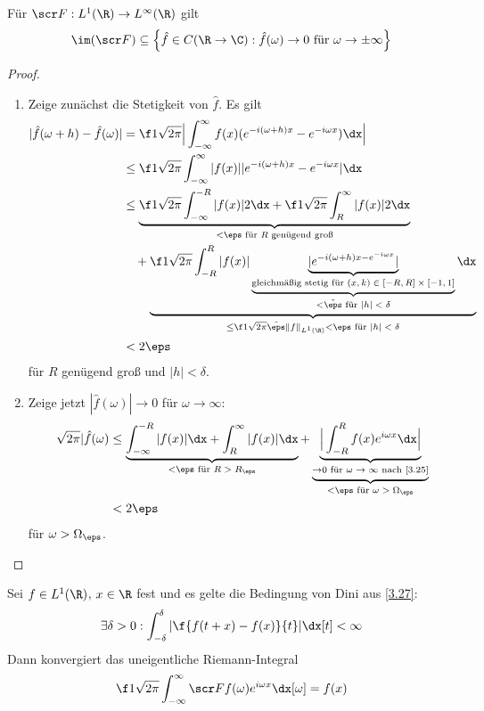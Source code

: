 \begin{st} \label{4.25}
	Für $\scr F: L^1(\R) \to L^\infty(\R)$ gilt
	\[
		\im (\scr F) \subset \Big\{ \hat f \in C(\R \to \C) : \hat f(\omega) \to 0 \text{ für } \omega \to \pm \infty \Big\}
	\]
	\begin{proof}
		\begin{enumerate}[1)]
			\item
				Zeige zunächst die Stetigkeit von $\hat f$.
				Es gilt
				\begin{align*}
					| \hat f(\omega + h) - \hat f(\omega) |
					&= \f 1{\sqrt{2\pi}} \Big| \int_{-\infty}^\infty f(x) ( e^{-i(\omega + h)x} - e^{-i \omega x} ) \dx \Big| \\
					&\le \f 1{\sqrt{2\pi}} \int_{-\infty}^\infty |f(x)| | e^{-i(\omega + h)x} - e^{-i \omega x} | \dx \\
					&\le \underbrace{\f 1{\sqrt{2\pi}} \int_{-\infty}^{-R} |f(x)| 2 \dx
						+ \f 1{\sqrt{2\pi}} \int_{R}^{\infty} |f(x)| 2 \dx}_{< \eps \text{ für $R$ genügend groß}} \\
						&\quad + \underbrace{\f 1{\sqrt{2\pi}} \int_{-R}^{R} |f(x)| \underbrace{\underbrace{|e^{-i(\omega + h) x - e^{-i \omega x}}|}_{\text{gleichmäßig stetig für $(x,k) \in [-R,R] \times [-1,1]$}}}_{< \tilde \eps \text{ für $|h|<\delta$}} \dx}_{\le \f 1{\sqrt{2\pi}} \tilde \eps \|f\|_{L^1(\R)} < \eps \text{ für $|h|<\delta$}} \\
					&< 2\eps
				\end{align*}
				für $R$ genügend groß und $|h| < \delta$.
			\item
				Zeige jetzt $|\hat f(\omega)| \to 0$ für $\omega \to \infty$:
				\begin{align*}
					\sqrt{2\pi} |\hat f(\omega)
					&\le  \underbrace{\int_{-\infty}^{-R} |f(x)| \dx + \int_{R}^{\infty} |f(x)| \dx}_{<\eps \text{ für $R > R_\eps$}}
					+ \underbrace{\underbrace{\Big| \int_{-R}^R f(x) e^{i\omega x} \dx \Big|}_{\to 0 \text{ für $\omega \to \infty$ nach \ref{3.25}}}}_{<\eps \text{ für $\omega > \Omega_\eps$}} \\
					&< 2\eps
				\end{align*}
				für $\omega > \Omega_\eps$.
		\end{enumerate}
	\end{proof}
\end{st}

\begin{st} \label{4.26}
	Sei $f \in L^1(\R)$, $x \in \R$ fest und es gelte die Bedingung von Dini aus \ref{3.27}:
	\[
		\exists \delta > 0 : \int_{-\delta}^{\delta} | \f {f(t+x)-f(x)}{t} | \dx[t] < \infty
	\]
	Dann konvergiert das uneigentliche Riemann-Integral
	\[
		\f 1{\sqrt{2\pi}} \int_{-\infty}^\infty \scr F f(\omega) e^{i \omega x} \dx[\omega] = f(x)
	\]
\end{st}



